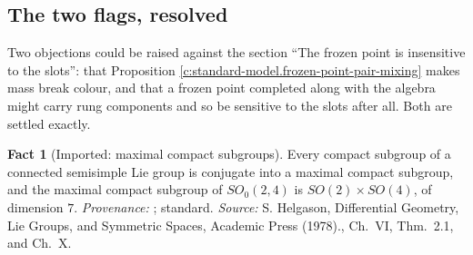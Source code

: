 \documentclass[11pt]{article}
\theoremstyle{definition}
\newtheorem{fact}[theorem]{Fact}
\theoremstyle{plain}
\begin{document}
\subsection*{The two flags, resolved}
\label{c:note.standard-model.setting-two-flags-resolved}
Two objections could be raised against the section ``The frozen point is insensitive to the slots'': that Proposition \ref{c:standard-model.frozen-point-pair-mixing} makes mass break colour, and that a frozen point completed along with the algebra might carry rung components and so be sensitive to the slots after all. Both are settled exactly.

\begin{fact}[Imported: maximal compact subgroups]\label{c:standard-model.imported-maximal-compact-subgroups}
Every compact subgroup of a connected semisimple Lie group is conjugate into a maximal compact subgroup, and the maximal compact subgroup of $SO_{0}(2,4)$ is $SO(2) \times SO(4)$, of dimension $7$. \emph{Provenance:} \cite[Ch.~VI, Thm.~2.1, and Ch.~X]{Helgason1978}; standard.
\emph{Source:} S. Helgason, Differential Geometry, Lie Groups, and Symmetric Spaces, Academic Press (1978)., Ch.~VI, Thm.~2.1, and Ch.~X.
\end{fact}
\end{document}
